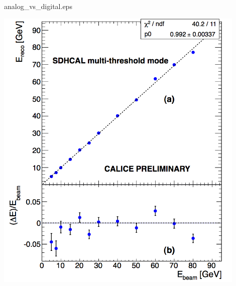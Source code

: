 \begin{frame}{analog\_vs\_digital.eps}
  \centerline{\includegraphics[width=0.9\textwidth]{images/Beam2012Linearity}}
\end{frame}

